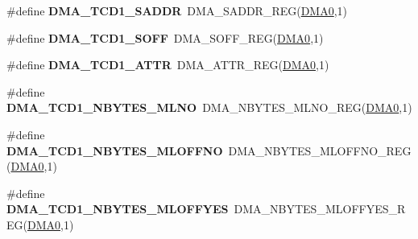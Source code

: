 \begin{DoxyCompactItemize}
\item 
\#define {\bfseries D\+M\+A\+\_\+\+T\+C\+D1\+\_\+\+S\+A\+D\+DR}~D\+M\+A\+\_\+\+S\+A\+D\+D\+R\+\_\+\+R\+EG(\hyperlink{group__DMA__Peripheral__Access__Layer_ga4103044f9ca209772f513dc694513ffb}{D\+M\+A0},1)\hypertarget{group__DMA__Register__Accessor__Macros_ga94212bd95654bfd40e69abc92d60ba81}{}\label{group__DMA__Register__Accessor__Macros_ga94212bd95654bfd40e69abc92d60ba81}

\item 
\#define {\bfseries D\+M\+A\+\_\+\+T\+C\+D1\+\_\+\+S\+O\+FF}~D\+M\+A\+\_\+\+S\+O\+F\+F\+\_\+\+R\+EG(\hyperlink{group__DMA__Peripheral__Access__Layer_ga4103044f9ca209772f513dc694513ffb}{D\+M\+A0},1)\hypertarget{group__DMA__Register__Accessor__Macros_ga2ef23070556cc663eb4b1189fb07e121}{}\label{group__DMA__Register__Accessor__Macros_ga2ef23070556cc663eb4b1189fb07e121}

\item 
\#define {\bfseries D\+M\+A\+\_\+\+T\+C\+D1\+\_\+\+A\+T\+TR}~D\+M\+A\+\_\+\+A\+T\+T\+R\+\_\+\+R\+EG(\hyperlink{group__DMA__Peripheral__Access__Layer_ga4103044f9ca209772f513dc694513ffb}{D\+M\+A0},1)\hypertarget{group__DMA__Register__Accessor__Macros_ga39a0c29d2a82a8e6bd8f88bb52ab5210}{}\label{group__DMA__Register__Accessor__Macros_ga39a0c29d2a82a8e6bd8f88bb52ab5210}

\item 
\#define {\bfseries D\+M\+A\+\_\+\+T\+C\+D1\+\_\+\+N\+B\+Y\+T\+E\+S\+\_\+\+M\+L\+NO}~D\+M\+A\+\_\+\+N\+B\+Y\+T\+E\+S\+\_\+\+M\+L\+N\+O\+\_\+\+R\+EG(\hyperlink{group__DMA__Peripheral__Access__Layer_ga4103044f9ca209772f513dc694513ffb}{D\+M\+A0},1)\hypertarget{group__DMA__Register__Accessor__Macros_ga815c5f40d67ad04ac54fdb097ba16f7f}{}\label{group__DMA__Register__Accessor__Macros_ga815c5f40d67ad04ac54fdb097ba16f7f}

\item 
\#define {\bfseries D\+M\+A\+\_\+\+T\+C\+D1\+\_\+\+N\+B\+Y\+T\+E\+S\+\_\+\+M\+L\+O\+F\+F\+NO}~D\+M\+A\+\_\+\+N\+B\+Y\+T\+E\+S\+\_\+\+M\+L\+O\+F\+F\+N\+O\+\_\+\+R\+EG(\hyperlink{group__DMA__Peripheral__Access__Layer_ga4103044f9ca209772f513dc694513ffb}{D\+M\+A0},1)\hypertarget{group__DMA__Register__Accessor__Macros_gad6f0e77e436a6181f1de8a5c76f852e4}{}\label{group__DMA__Register__Accessor__Macros_gad6f0e77e436a6181f1de8a5c76f852e4}

\item 
\#define {\bfseries D\+M\+A\+\_\+\+T\+C\+D1\+\_\+\+N\+B\+Y\+T\+E\+S\+\_\+\+M\+L\+O\+F\+F\+Y\+ES}~D\+M\+A\+\_\+\+N\+B\+Y\+T\+E\+S\+\_\+\+M\+L\+O\+F\+F\+Y\+E\+S\+\_\+\+R\+EG(\hyperlink{group__DMA__Peripheral__Access__Layer_ga4103044f9ca209772f513dc694513ffb}{D\+M\+A0},1)\hypertarget{group__DMA__Register__Accessor__Macros_gabca874a7a0dda11149a7ffbc59fd4f67}{}\label{group__DMA__Register__Accessor__Macros_gabca874a7a0dda11149a7ffbc59fd4f67}


\end{DoxyCompactItemize}
